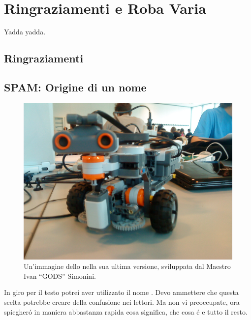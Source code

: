 \chapter{Ringraziamenti e Roba Varia}

Yadda yadda.

\section{Ringraziamenti}

\section{SPAM: Origine di un nome}
\begin{figure}[b]
    \includegraphics[width=\columnwidth]{Pictures/SPAM}
    \caption{Un'immagine dello \SPAM{} nella sua ultima versione,
    sviluppata dal Maestro Ivan ``GODS'' Simonini.}
    \label{fig:spam}
\end{figure}
In giro per il testo potrei aver utilizzato il nome \SPAM{}. Devo ammettere
che questa scelta potrebbe creare della confusione nei lettori. Ma non vi
preoccupate, ora spiegher\'o in maniera abbastanza rapida cosa significa,
che cosa \'e e tutto il resto.

\cleardoublepage
